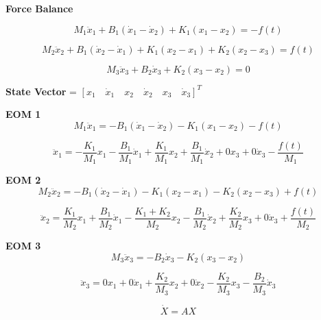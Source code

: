 \documentclass[letterpaper,11pt]{article}
\begin{document}
\noindent \textbf{Force Balance}

\[
M_1 \ddot{x}_1 + B_1(\dot{x}_1 - \dot{x}_2) + K_1(x_1 - x_2) = -f(t)
\]

\[
M_2 \ddot{x}_2 + B_1(\dot{x}_2 - \dot{x}_1) + K_1(x_2 - x_1) + K_2(x_2 - x_3) = f(t)
\]

\[
M_3 \ddot{x}_3 + B_2 \dot{x}_3 + K_2(x_3 - x_2) = 0
\]

\noindent \textbf{State Vector} = $[x_1 \quad \dot{x}_1 \quad x_2 \quad \dot{x}_2 \quad x_3 \quad \dot{x}_3]^T$

\noindent \textbf{EOM 1}
\[
M_1 \ddot{x}_1 = -B_1(\dot{x}_1 - \dot{x}_2) - K_1(x_1 - x_2) - f(t)
\]

\[
\ddot{x}_1 = -\frac{K_1}{M_1} x_1 - \frac{B_1}{M_1} \dot{x}_1 + \frac{K_1}{M_1} x_2 + \frac{B_1}{M_1} \dot{x}_2 + 0   x_3 + 0   \dot{x}_3 - \frac{f(t)}{M_1}
\]

\noindent \textbf{EOM 2}
\[
M_2 \ddot{x}_2 = -B_1(\dot{x}_2 - \dot{x}_1) - K_1(x_2 - x_1) - K_2(x_2 - x_3) + f(t)
\]

\[
\ddot{x}_2 = \frac{K_1}{M_2} x_1 + \frac{B_1}{M_2} \dot{x}_1 - \frac{K_1 + K_2}{M_2} x_2 - \frac{B_1}{M_2} \dot{x}_2 + \frac{K_2}{M_2} x_3 + 0   \dot{x}_3 + \frac{f(t)}{M_2}
\]

\noindent \textbf{EOM 3}
\[
M_3 \ddot{x}_3 = -B_2 \dot{x}_3 - K_2(x_3 - x_2)
\]

\[
\ddot{x}_3 = 0   x_1 + 0   \dot{x}_1 + \frac{K_2}{M_3} x_2 + 0   \dot{x}_2 - \frac{K_2}{M_3} x_3 - \frac{B_2}{M_3} \dot{x}_3
\]

\[
\dot{X} = A X
\]
\end{document}
